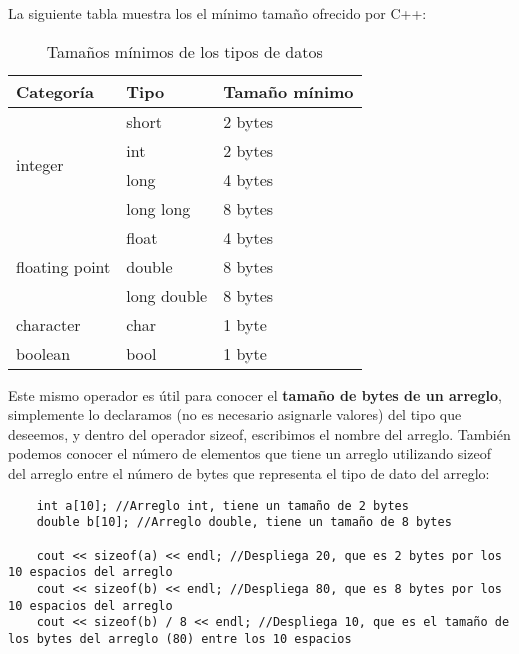 La siguiente tabla muestra los el mínimo tamaño ofrecido por C++:
\begin{table}[H]
    \begin{center}
        \caption{Tamaños mínimos de los tipos de datos}
        \label{tab: 6}
        \begin{tabular}{m{3cm} m{3cm} m{5cm}}
            \hline
            \textbf{Categoría}&\textbf{Tipo}&\textbf{Tamaño mínimo} \\
            \hline
            \multirow{4}{3cm}{integer}          & short         & 2 bytes \\
                                                & int           & 2 bytes \\
                                                & long          & 4 bytes \\
                                                & long long     & 8 bytes \\
            \multirow{3}{3cm}{floating point}   & float         & 4 bytes \\
                                                & double        & 8 bytes \\
                                                & long double   & 8 bytes \\
            character                           & char          & 1 byte \\
            boolean                             & bool          & 1 byte \\
            \hline
        \end{tabular}
    \end{center}    
\end{table}

Este mismo operador es útil para conocer el \textbf{tamaño de bytes de un arreglo}, simplemente lo declaramos (no es necesario asignarle valores) del tipo que deseemos, y dentro del operador sizeof, escribimos el nombre del arreglo. También podemos conocer el número de elementos que tiene un arreglo utilizando sizeof del arreglo entre el número de bytes que representa el tipo de dato del arreglo:
\begin{lstlisting}
    int a[10]; //Arreglo int, tiene un tamaño de 2 bytes
    double b[10]; //Arreglo double, tiene un tamaño de 8 bytes
    
    cout << sizeof(a) << endl; //Despliega 20, que es 2 bytes por los 10 espacios del arreglo
    cout << sizeof(b) << endl; //Despliega 80, que es 8 bytes por los 10 espacios del arreglo
    cout << sizeof(b) / 8 << endl; //Despliega 10, que es el tamaño de los bytes del arreglo (80) entre los 10 espacios
\end{lstlisting}